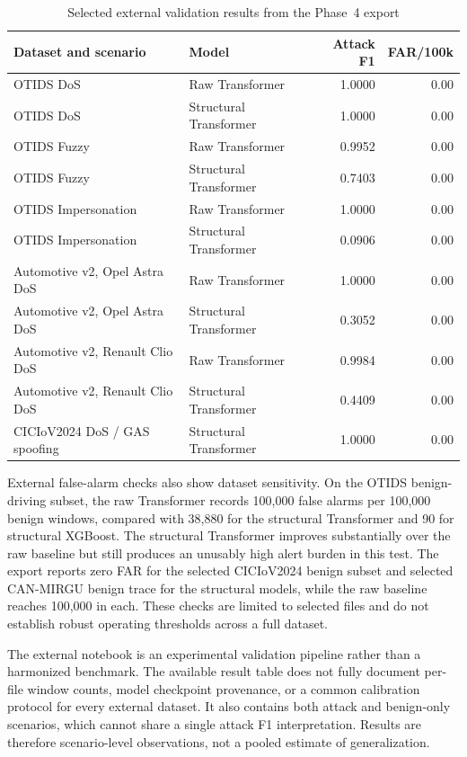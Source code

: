\documentclass[12pt, a4paper, reqno, oneside]{book}
\begin{document}
\begin{table}[htbp]
\centering
\caption{Selected external validation results from the Phase~4 export}
\label{tab:external_results}
\small
\renewcommand{\arraystretch}{1.1}
\begin{tabular}{p{3.6cm}p{3.8cm}rr}
\hline
\textbf{Dataset and scenario} & \textbf{Model} & \textbf{Attack F1} & \textbf{FAR/100k} \\
\hline
OTIDS DoS & Raw Transformer & 1.0000 & 0.00 \\
OTIDS DoS & Structural Transformer & 1.0000 & 0.00 \\
OTIDS Fuzzy & Raw Transformer & 0.9952 & 0.00 \\
OTIDS Fuzzy & Structural Transformer & 0.7403 & 0.00 \\
OTIDS Impersonation & Raw Transformer & 1.0000 & 0.00 \\
OTIDS Impersonation & Structural Transformer & 0.0906 & 0.00 \\
Automotive v2, Opel Astra DoS & Raw Transformer & 1.0000 & 0.00 \\
Automotive v2, Opel Astra DoS & Structural Transformer & 0.3052 & 0.00 \\
Automotive v2, Renault Clio DoS & Raw Transformer & 0.9984 & 0.00 \\
Automotive v2, Renault Clio DoS & Structural Transformer & 0.4409 & 0.00 \\
CICIoV2024 DoS / GAS spoofing & Structural Transformer & 1.0000 & 0.00 \\
\hline
\end{tabular}
\end{table}

External false-alarm checks also show dataset sensitivity. On the OTIDS benign-driving subset, the raw Transformer records 100,000 false alarms per 100,000 benign windows, compared with 38,880 for the structural Transformer and 90 for structural XGBoost. The structural Transformer improves substantially over the raw baseline but still produces an unusably high alert burden in this test. The export reports zero FAR for the selected CICIoV2024 benign subset and selected CAN-MIRGU benign trace for the structural models, while the raw baseline reaches 100,000 in each. These checks are limited to selected files and do not establish robust operating thresholds across a full dataset.

The external notebook is an experimental validation pipeline rather than a harmonized benchmark. The available result table does not fully document per-file window counts, model checkpoint provenance, or a common calibration protocol for every external dataset. It also contains both attack and benign-only scenarios, which cannot share a single attack F1 interpretation. Results are therefore scenario-level observations, not a pooled estimate of generalization.
\end{document}
